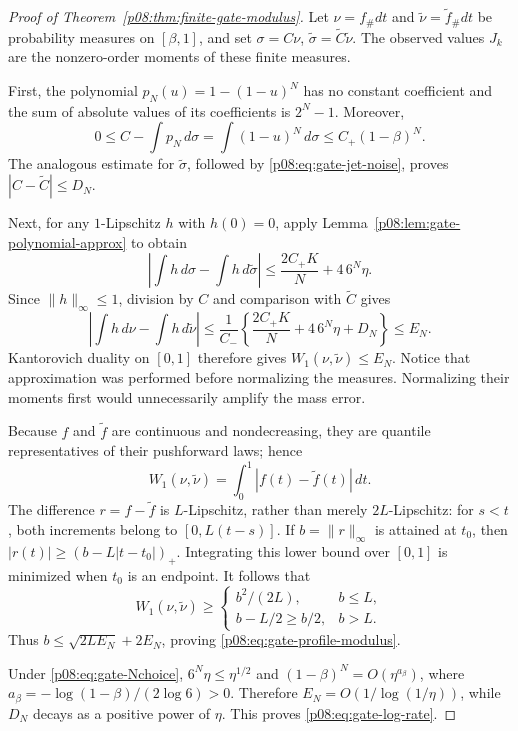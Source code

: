 \documentclass[11pt,letterpaper]{article}
\theoremstyle{definition}
\theoremstyle{remark}
\newcommand{\1}{\mathbf 1}
\begin{document}
\begin{proof}[Proof of Theorem~\ref{p08:thm:finite-gate-modulus}]
Let $\nu=f_\#dt$ and $\widetilde\nu=\widetilde f_\#dt$ be probability
measures on $[\beta,1]$, and set $\sigma=C\nu$,
$\widetilde\sigma=\widetilde C\widetilde\nu$.  The observed values
$J_k$ are the nonzero-order moments of these finite measures.

First, the polynomial $p_N(u)=1-(1-u)^N$ has no constant coefficient and
the sum of absolute values of its coefficients is $2^N-1$.  Moreover,
\[
 0\leq C-\int p_N\,d\sigma
 =\int(1-u)^N\,d\sigma\leq C_+(1-\beta)^N.
\]
The analogous estimate for $\widetilde\sigma$, followed by
\eqref{p08:eq:gate-jet-noise}, proves $|C-\widetilde C|\leq D_N$.

Next, for any $1$-Lipschitz $h$ with $h(0)=0$, apply
Lemma~\ref{p08:lem:gate-polynomial-approx} to obtain
\[
 \left|\int h\,d\sigma-\int h\,d\widetilde\sigma\right|
 \leq\frac{2C_+K}{N}+4\,6^N\eta.
\]
Since $\|h\|_\infty\leq1$, division by $C$ and comparison with
$\widetilde C$ gives
\[
 \left|\int h\,d\nu-\int h\,d\widetilde\nu\right|
 \leq\frac1{C_-}\left\{\frac{2C_+K}{N}+4\,6^N\eta+D_N\right\}
 \leq E_N.
\]
Kantorovich duality on $[0,1]$ therefore gives
$W_1(\nu,\widetilde\nu)\leq E_N$.  Notice that approximation was
performed before normalizing the measures.  Normalizing their moments
first would unnecessarily amplify the mass error.

Because $f$ and $\widetilde f$ are continuous and nondecreasing, they are
quantile representatives of their pushforward laws; hence
\begin{equation}\label{p08:eq:gate-quantile-distance}
 W_1(\nu,\widetilde\nu)=\int_0^1|f(t)-\widetilde f(t)|\,dt.
\end{equation}
The difference $r=f-\widetilde f$ is $L$-Lipschitz, rather than merely
$2L$-Lipschitz: for $s<t$, both increments belong to $[0,L(t-s)]$.
If $b=\|r\|_\infty$ is attained at $t_0$, then
$|r(t)|\geq(b-L|t-t_0|)_+$.  Integrating this lower bound over $[0,1]$
is minimized when $t_0$ is an endpoint.  It follows that
\[
 W_1(\nu,\widetilde\nu)\geq
 \begin{cases}
 b^2/(2L),&b\leq L,\\
 b-L/2\geq b/2,&b>L.
 \end{cases}
\]
Thus $b\leq\sqrt{2LE_N}+2E_N$, proving
\eqref{p08:eq:gate-profile-modulus}.

Under \eqref{p08:eq:gate-Nchoice}, $6^N\eta\leq\eta^{1/2}$ and
$(1-\beta)^N=O(\eta^{a_\beta})$, where
$a_\beta=-\log(1-\beta)/(2\log6)>0$.
Therefore $E_N=O(1/\log(1/\eta))$, while $D_N$ decays as a positive
power of $\eta$.  This proves \eqref{p08:eq:gate-log-rate}.
\end{proof}
\end{document}

